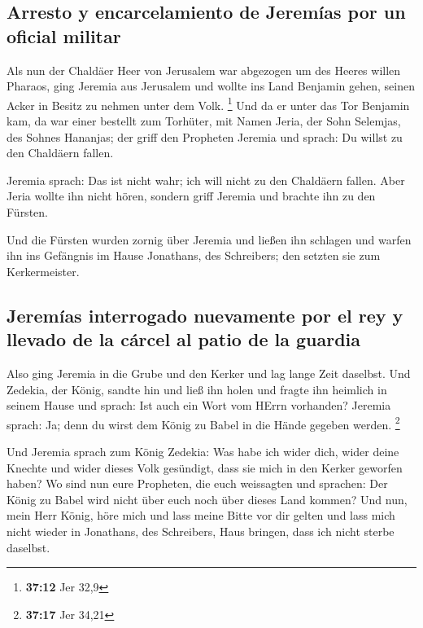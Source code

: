 \hypertarget{arresto-y-encarcelamiento-de-jeremuxedas-por-un-oficial-militar}{%
\subsection{Arresto y encarcelamiento de Jeremías por un oficial
militar}\label{arresto-y-encarcelamiento-de-jeremuxedas-por-un-oficial-militar}}

 Als nun der Chaldäer Heer von Jerusalem war abgezogen um
des Heeres willen Pharaos,  ging Jeremia aus Jerusalem
und wollte ins Land Benjamin gehen, seinen Acker in Besitz zu nehmen
unter dem Volk. \footnote{\textbf{37:12} Jer 32,9}  Und
da er unter das Tor Benjamin kam, da war einer bestellt zum Torhüter,
mit Namen Jeria, der Sohn Selemjas, des Sohnes Hananjas; der griff den
Propheten Jeremia und sprach: Du willst zu den Chaldäern fallen.

 Jeremia sprach: Das ist nicht wahr; ich will nicht zu
den Chaldäern fallen. Aber Jeria wollte ihn nicht hören, sondern griff
Jeremia und brachte ihn zu den Fürsten.

 Und die Fürsten wurden zornig über Jeremia und ließen
ihn schlagen und warfen ihn ins Gefängnis im Hause Jonathans, des
Schreibers; den setzten sie zum Kerkermeister.

\hypertarget{jeremuxedas-interrogado-nuevamente-por-el-rey-y-llevado-de-la-cuxe1rcel-al-patio-de-la-guardia}{%
\subsection{Jeremías interrogado nuevamente por el rey y llevado de la
cárcel al patio de la
guardia}\label{jeremuxedas-interrogado-nuevamente-por-el-rey-y-llevado-de-la-cuxe1rcel-al-patio-de-la-guardia}}

 Also ging Jeremia in die Grube und den Kerker und lag
lange Zeit daselbst.  Und Zedekia, der König, sandte hin
und ließ ihn holen und fragte ihn heimlich in seinem Hause und sprach:
Ist auch ein Wort vom HErrn vorhanden? Jeremia sprach: Ja; denn du wirst
dem König zu Babel in die Hände gegeben werden. \footnote{\textbf{37:17}
  Jer 34,21}

 Und Jeremia sprach zum König Zedekia: Was habe ich wider
dich, wider deine Knechte und wider dieses Volk gesündigt, dass sie mich
in den Kerker geworfen haben?  Wo sind nun eure
Propheten, die euch weissagten und sprachen: Der König zu Babel wird
nicht über euch noch über dieses Land kommen?  Und nun,
mein Herr König, höre mich und lass meine Bitte vor dir gelten und lass
mich nicht wieder in Jonathans, des Schreibers, Haus bringen, dass ich
nicht sterbe daselbst.

